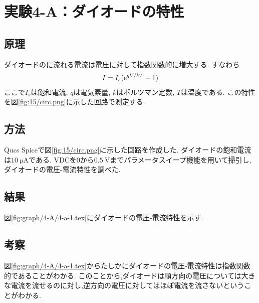 \section{実験4-A：ダイオードの特性}
\subsection{原理}
ダイオードのに流れる電流は電圧に対して指数関数的に増大する.
すなわち
\begin{align}
  I=I_s({\rm e}^{qV/kT}-1)
\end{align}
ここで$I_s$は飽和電流, $q$は電気素量, $k$はボルツマン定数, $T$は温度である.
この特性を図\ref{fig:15/circ.png}に示した回路で測定する.
\subsection{方法}
Qucs Spiceで図\ref{fig:15/circ.png}に示した回路を作成した.
ダイオードの飽和電流は$10\ \si{\micro\ampere}$である.
VDCを0から$0.5\ \si{\volt}$までパラメータスイープ機能を用いて掃引し,ダイオードの電圧-電流特性を調べた.
\subsection{結果}
図\ref{fig:graph/4-A/4-a-1.tex}にダイオードの電圧-電流特性を示す.
\subsection{考察}
図\ref{fig:graph/4-A/4-a-1.tex}からたしかにダイオードの電圧-電流特性は指数関数的であることがわかる.
このことから,ダイオードは順方向の電圧については大きな電流を流せるのに対し,逆方向の電圧に対してはほぼ電流を流さないということがわかる.